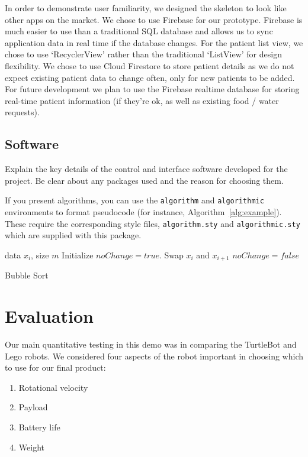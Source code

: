 \documentclass{article}
\begin{document}
In order to demonstrate user familiarity, we designed the skeleton to look like other apps on the market. We chose to use Firebase for our prototype. Firebase is much easier to use than a traditional SQL database and allows us to sync application data in real time if the database changes. For the patient list view, we chose to use `RecyclerView' rather than the traditional `ListView' for design flexibility. We chose to use Cloud Firestore to store patient details as we do not expect existing patient data to change often, only for new patients to be added. For future development we plan to use the Firebase realtime database for storing real-time patient information (if they're ok, as well as existing food / water requests).

\subsection{Software}

Explain the key details of the control and interface software developed for the project. Be clear about any packages used and the reason for choosing them. 

If you present algorithms, you can use the \verb+algorithm+ and \verb+algorithmic+ environments to format pseudocode (for instance, Algorithm~\ref{alg:example}). These require the corresponding style files, \verb+algorithm.sty+ and \verb+algorithmic.sty+ which are supplied with this package. 

\begin{algorithm}[ht]
\begin{algorithmic}
    data $x_i$, size $m$
   \REPEAT
   \STATE Initialize $noChange = true$.
   \STATE Swap $x_i$ and $x_{i+1}$
   \STATE $noChange = false$
   \ENDIF
   \ENDFOR
\end{algorithmic}
  \caption{Bubble Sort}
  \label{alg:example}
\end{algorithm}

\section{Evaluation}
Our main quantitative testing in this demo was in comparing the TurtleBot and Lego robots. We considered four aspects of the robot important in choosing which to use for our final product:
\begin{enumerate}
\item Rotational velocity
\item Payload
\item Battery life
\item Weight
\end{enumerate}
\end{document}
